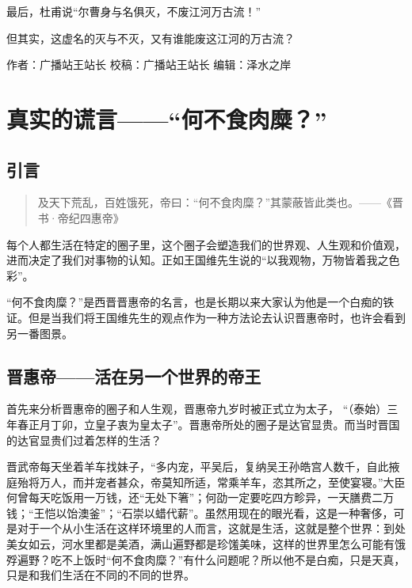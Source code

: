 \documentclass[]{book}
\begin{document}
最后，杜甫说``尔曹身与名俱灭，不废江河万古流！''

但其实，这虚名的灭与不灭，又有谁能废这江河的万古流？

作者：广播站王站长 校稿：广播站王站长 编辑：泽水之岸

\section{\texorpdfstring{真实的谎言------``何不食肉糜？''}{真实的谎言------何不食肉糜？}}

\subsection{引言}\label{-2}

\begin{quote}
及天下荒乱，百姓饿死，帝曰：``何不食肉糜？''其蒙蔽皆此类也。------《晋书·帝纪四惠帝》
\end{quote}

每个人都生活在特定的圈子里，这个圈子会塑造我们的世界观、人生观和价值观，进而决定了我们对事物的认知。正如王国维先生说的``以我观物，万物皆着我之色彩''。

``何不食肉糜？''是西晋晋惠帝的名言，也是长期以来大家认为他是一个白痴的铁证。但是当我们将王国维先生的观点作为一种方法论去认识晋惠帝时，也许会看到另一番图景。

\subsection{晋惠帝------活在另一个世界的帝王}

首先来分析晋惠帝的圈子和人生观，晋惠帝九岁时被正式立为太子，
``（泰始）三年春正月丁卯，立皇子衷为皇太子''。晋惠帝所处的圈子是达官显贵。而当时晋国的达官显贵们过着怎样的生活？

晋武帝每天坐着羊车找妹子，``多内宠，平吴后，复纳吴王孙皓宫人数千，自此掖庭殆将万人，而并宠者甚众，帝莫知所适，常乘羊车，恣其所之，至使宴寝。''大臣何曾每天吃饭用一万钱，还``无处下箸''；何劭一定要吃四方畛异，一天膳费二万钱；``王恺以饴澳釜''；``石崇以蜡代薪''。虽然用现在的眼光看，这是一种奢侈，可是对于一个从小生活在这样环境里的人而言，这就是生活，这就是整个世界：到处美女如云，河水里都是美酒，满山遍野都是珍馐美味，这样的世界里怎么可能有饿殍遍野？吃不上饭时``何不食肉糜？''有什么问题呢？所以他不是白痴，只是天真，只是和我们生活在不同的不同的世界。
\end{document}
